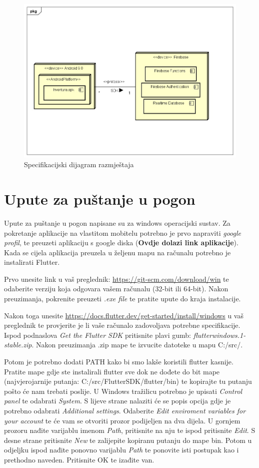 			\begin{figure}[H]
				\centering
				\includegraphics[width=0.8\linewidth]{"slike/Deployment Diagram"}
				\caption{Specifikacijski dijagram razmještaja}
				\label{Slika 5.4}
			\end{figure}
			
			\eject 
		
		\section{Upute za puštanje u pogon}
		
			Upute za puštanje u pogon napisane su za windows operacijski sustav. Za pokretanje aplikacije na vlastitom mobitelu potrebno je prvo napraviti \textit{google profil}, te preuzeti aplikaciju s google diska (\textbf{Ovdje dolazi link aplikacije}). Kada se cijela aplikacija preuzela u željenu mapu na računalu potrebno je instalirati Flutter.
			
			Prvo unesite link u vaš preglednik: \url{https://git-scm.com/download/win} te odaberite verziju koja odgovara vašem računalu (32-bit ili 64-bit). Nakon preuzimanja, pokrenite preuzeti \textit{.exe file} te pratite upute do kraja instalacije.
			
			Nakon toga unesite \url{https://docs.flutter.dev/get-started/install/windows} u vaš preglednik te provjerite je li vaše računalo zadovoljava potrebne specifikacije. Ispod podnaslova \textit{Get the Flutter SDK} pritisnite plavi gumb: \textit{flutter\textunderscore windows.1-stable.zip}. Nakon preuzimanja .zip mape te izvucite datoteke u mapu C:/src/.
			
			Potom je potrebno dodati PATH kako bi smo lakše koristili flutter kasnije. Pratite mape gdje ste instalirali flutter sve dok ne dođete do bit mape (najvjerojarnije putanja: C:/src/FlutterSDK/flutter/bin) te kopirajte tu putanju pošto će nam trebati poslije. U Windows tražilicu potrebno je upisati \textit{Control panel} te odabrati \textit{System}. S lijeve strane nalaziti će se popis opcija gdje je potrebno odabrati \textit{Additional settings}. Odaberite \textit{Edit enviroment variables for your account} te će vam se otvoriti prozor podijeljen na dva dijela. U gornjem prozoru nađite varijablu imenom \textit{Path}, pritisnite na nju te ispod pritisnite \textit{Edit}. S desne strane pritisnite \textit{New} te zalijepite kopiranu putanju do mape bin. Potom u odjeljku ispod nađite ponovno varijablu \textit{Path} te ponovite isti postupak kao i prethodno naveden. Pritisnite OK te izađite van.
			
